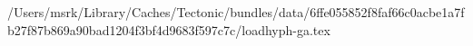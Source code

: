 /Users/msrk/Library/Caches/Tectonic/bundles/data/6ffe055852f8faf66c0acbe1a7fb27f87b869a90bad1204f3bf4d9683f597c7c/loadhyph-ga.tex
